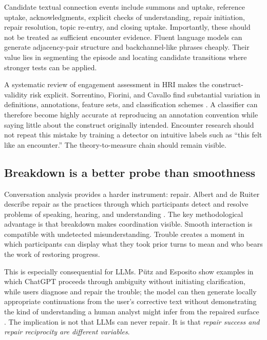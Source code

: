\documentclass[11pt]{article}
\begin{document}
Candidate textual connection events include summons and uptake, reference uptake, acknowledgments, explicit checks of understanding, repair initiation, repair resolution, topic re-entry, and closing uptake. Importantly, these should not be treated as sufficient encounter evidence. Fluent language models can generate adjacency-pair structure and backchannel-like phrases cheaply. Their value lies in segmenting the episode and locating candidate transitions where stronger tests can be applied.

A systematic review of engagement assessment in HRI makes the construct-validity risk explicit. Sorrentino, Fiorini, and Cavallo find substantial variation in definitions, annotations, feature sets, and classification schemes \citep{SorrentinoEtAl2024Engagement}. A classifier can therefore become highly accurate at reproducing an annotation convention while saying little about the construct originally intended. Encounter research should not repeat this mistake by training a detector on intuitive labels such as ``this felt like an encounter.'' The theory-to-measure chain should remain visible.

\subsection{Breakdown is a better probe than smoothness}

Conversation analysis provides a harder instrument: repair. Albert and de Ruiter describe repair as the practices through which participants detect and resolve problems of speaking, hearing, and understanding \citep{AlbertDeRuiter2018Repair}. The key methodological advantage is that breakdown makes coordination visible. Smooth interaction is compatible with undetected misunderstanding. Trouble creates a moment in which participants can display what they took prior turns to mean and who bears the work of restoring progress.

This is especially consequential for LLMs. P\"utz and Esposito show examples in which ChatGPT proceeds through ambiguity without initiating clarification, while users diagnose and repair the trouble; the model can then generate locally appropriate continuations from the user's corrective text without demonstrating the kind of understanding a human analyst might infer from the repaired surface \citep{PutzEsposito2024Repair}. The implication is not that LLMs can never repair. It is that \emph{repair success and repair reciprocity are different variables}.
\end{document}
